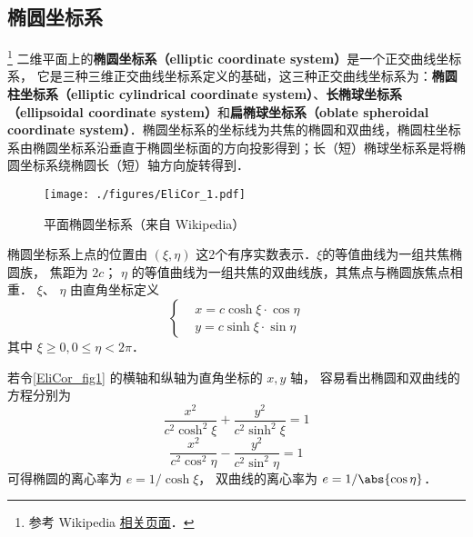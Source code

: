 
\begin{issues}
\end{issues}


\subsection{椭圆坐标系}
\footnote{参考 Wikipedia \href{https://en.wikipedia.org/wiki/Elliptic_coordinate_system}{相关页面}．}
二维平面上的\textbf{椭圆坐标系（elliptic coordinate system）}是一个正交曲线坐标系， 它是三种三维正交曲线坐标系定义的基础，这三种正交曲线坐标系为：\textbf{椭圆柱坐标系（elliptic cylindrical coordinate system）}、\textbf{长椭球坐标系（ellipsoidal coordinate system）}和\textbf{扁椭球坐标系（oblate spheroidal coordinate system）}．椭圆坐标系的坐标线为共焦的椭圆和双曲线，椭圆柱坐标系由椭圆坐标系沿垂直于椭圆坐标面的方向投影得到；长（短）椭球坐标系是将椭圆坐标系绕椭圆长（短）轴方向旋转得到．

\begin{figure}[ht]
\centering
\texttt{[image: ./figures/EliCor\_1.pdf]}
\caption{平面椭圆坐标系（来自 Wikipedia）} \label{EliCor_fig1}
\end{figure}

椭圆坐标系上点的位置由 $(\xi,\eta)$ 这2个有序实数表示．$\xi$的等值曲线为一组共焦椭圆族， 焦距为 $2c$； $\eta$ 的等值曲线为一组共焦的双曲线族，其焦点与椭圆族焦点相重． $\xi$、 $\eta$ 由直角坐标定义
\begin{equation}\label{EliCor_eq3}
\left\{\begin{aligned}
&x=c\cosh\xi\cdot\cos\eta\\
&y=c\sinh\xi\cdot\sin\eta
\end{aligned}\right.
\end{equation}
其中 $\xi\geq0,0\leq\eta<2\pi$．

若令\autoref{EliCor_fig1} 的横轴和纵轴为直角坐标的 $x, y$ 轴， 容易看出椭圆和双曲线的方程分别为
\begin{equation}\label{EliCor_eq4}
\frac{x^2}{c^2\cosh^2\xi}+\frac{y^2}{c^2\sinh^2\xi}=1
\end{equation}
\begin{equation}\label{EliCor_eq5}
\frac{x^2}{c^2\cos^2\eta}-\frac{y^2}{c^2\sin^2\eta}=1
\end{equation}
可得椭圆的离心率为 $e = 1/\cosh \xi$， 双曲线的离心率为 $e = 1/\abs{\cos \eta}$．

